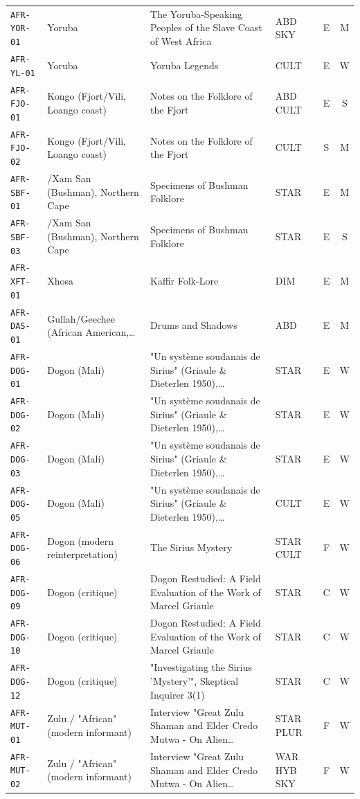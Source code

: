 \documentclass[11pt,a4paper]{article}
\begin{document}
\begin{longtable}{@{}p{1.6cm}p{3.6cm}p{6.9cm}p{2.1cm}cc@{}}
\texttt{AFR-YOR-01} & Yoruba & The Yoruba-Speaking Peoples of the Slave Coast of West Africa & ABD SKY & E & M \\
\texttt{AFR-YL-01} & Yoruba & Yoruba Legends & CULT & E & W \\
\texttt{AFR-FJO-01} & Kongo (Fjort/Vili, Loango coast) & Notes on the Folklore of the Fjort & ABD CULT & E & S \\
\texttt{AFR-FJO-02} & Kongo (Fjort/Vili, Loango coast) & Notes on the Folklore of the Fjort & CULT & S & M \\
\texttt{AFR-SBF-01} & /Xam San (Bushman), Northern Cape & Specimens of Bushman Folklore & STAR & E & M \\
\texttt{AFR-SBF-03} & /Xam San (Bushman), Northern Cape & Specimens of Bushman Folklore & STAR & E & S \\
\texttt{AFR-XFT-01} & Xhosa & Kaffir Folk-Lore & DIM & E & M \\
\texttt{AFR-DAS-01} & Gullah/Geechee (African American,… & Drums and Shadows & ABD & E & M \\
\texttt{AFR-DOG-01} & Dogon (Mali) & "Un système soudanais de Sirius" (Griaule \& Dieterlen 1950),… & STAR & E & W \\
\texttt{AFR-DOG-02} & Dogon (Mali) & "Un système soudanais de Sirius" (Griaule \& Dieterlen 1950),… & STAR & E & W \\
\texttt{AFR-DOG-03} & Dogon (Mali) & "Un système soudanais de Sirius" (Griaule \& Dieterlen 1950),… & STAR & E & W \\
\texttt{AFR-DOG-05} & Dogon (Mali) & "Un système soudanais de Sirius" (Griaule \& Dieterlen 1950),… & CULT & E & W \\
\texttt{AFR-DOG-06} & Dogon (modern reinterpretation) & The Sirius Mystery & STAR CULT & F & W \\
\texttt{AFR-DOG-09} & Dogon (critique) & Dogon Restudied: A Field Evaluation of the Work of Marcel Griaule & STAR & C & W \\
\texttt{AFR-DOG-10} & Dogon (critique) & Dogon Restudied: A Field Evaluation of the Work of Marcel Griaule & STAR & C & W \\
\texttt{AFR-DOG-12} & Dogon (critique) & "Investigating the Sirius 'Mystery'", Skeptical Inquirer 3(1) & STAR & C & W \\
\texttt{AFR-MUT-01} & Zulu / "African" (modern informant) & Interview "Great Zulu Shaman and Elder Credo Mutwa - On Alien… & STAR PLUR & F & W \\
\texttt{AFR-MUT-02} & Zulu / "African" (modern informant) & Interview "Great Zulu Shaman and Elder Credo Mutwa - On Alien… & WAR HYB SKY & F & W \\

\end{longtable}
\end{document}
